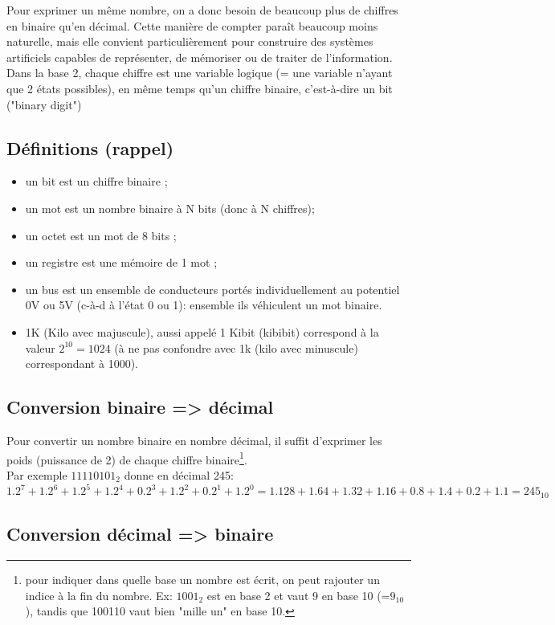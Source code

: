 Pour exprimer un même nombre, on a donc besoin de beaucoup plus de chiffres en binaire qu'en décimal.
Cette manière de compter paraît beaucoup moins naturelle, mais elle convient particulièrement pour construire des systèmes artificiels capables de représenter, de mémoriser ou de traiter de l'information.
Dans la base 2, chaque chiffre est une variable logique (= une variable n'ayant que 2 états possibles), en même temps qu'un chiffre binaire, c'est-à-dire un bit ("binary digit")

\subsection{Définitions (rappel)}
\begin{itemize}
\item un bit est un chiffre binaire ;
\item un mot est un nombre binaire à N bits (donc à N chiffres);
\item un octet est un mot de 8 bits ;
\item un registre est une mémoire de 1 mot ;
\item un bus est un ensemble de conducteurs portés individuellement au potentiel 0V ou 5V (c-à-d à l’état 0 ou 1): ensemble ils véhiculent un mot binaire.
\item 1K (Kilo avec majuscule), aussi appelé 1 Kibit (kibibit) correspond à la valeur $2^{10}=1024$ (à ne pas confondre avec 1k (kilo avec minuscule) correspondant à 1000).
\end{itemize}

\subsection{Conversion binaire => décimal}
Pour convertir un nombre binaire en nombre décimal, il suffit d'exprimer les poids (puissance de 2) de chaque chiffre binaire\footnote{pour indiquer dans quelle base un nombre est écrit, on peut rajouter un indice à la fin du nombre. Ex: $1001_2$ est en base 2 et vaut 9 en base 10 (=$9_{10}$), tandis que 100110 vaut bien "mille un" en base 10.}.\\
Par exemple $11110101_2$ donne en décimal 245:\\
$1.2^7 + 1.2^6 + 1.2^5 + 1.2^4 + 0.2^3 + 1.2^2 + 0.2^1 + 1.2^0 =
1.128 + 1.64 + 1.32 + 1.16 + 0.8 + 1.4 + 0.2 + 1.1 = 245_{10}$


\subsection{Conversion décimal => binaire}

